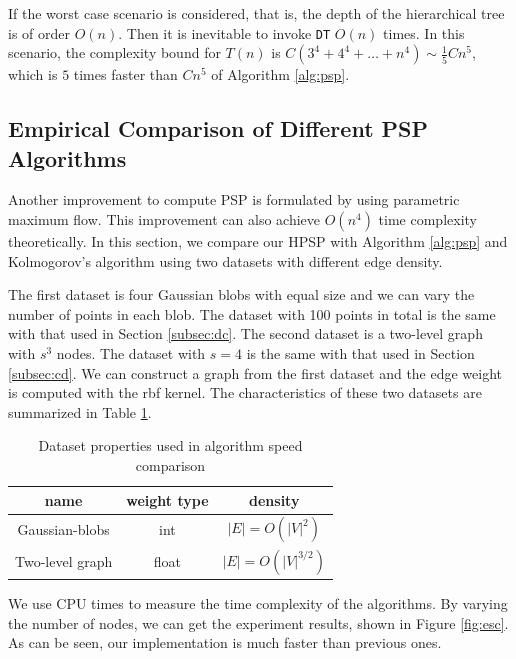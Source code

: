 If the worst case scenario is considered, that is, the depth of the hierarchical tree is of order $O(n)$. Then it is inevitable to invoke \texttt{DT} $O(n)$ times.
In this scenario, the complexity bound for $T(n)$ is $C(3^4+4^4 + \dots + n^4) \sim \frac{1}{5}Cn^5$, which is $5$ times faster than $Cn^5$ of Algorithm \ref{alg:psp}.

\subsection{Empirical Comparison of Different PSP Algorithms}
Another improvement to compute PSP is formulated by \cite{kolmogorov} using parametric maximum flow.
This improvement can also achieve $O(n^4)$ time complexity theoretically. 
In this section, we compare our HPSP with Algorithm \ref{alg:psp} and Kolmogorov's algorithm
using two datasets with different edge density.

The first dataset is four Gaussian blobs with equal size and we can vary the number of points in each blob. The dataset with 100 points in total is the same with that used in 
Section \ref{subsec:dc}. The second dataset is a two-level graph with $s^3$ nodes. The dataset with $s=4$ is the same with that used in Section \ref{subsec:cd}.
We can construct a graph from the first dataset and the edge weight is computed with the rbf kernel. The characteristics of these two datasets are summarized in
Table \ref{tab:alg_compare}.
\begin{table}[!ht]
\centering
\begin{tabular}{ccc}
\hline
name & weight type & density \\
\hline
Gaussian-blobs & int & $|E|=O(|V|^2)$\\
Two-level graph & float & $|E|=O(|V|^{3/2})$\\
\hline
\end{tabular}
\caption{Dataset properties used in algorithm speed comparison} \label{tab:alg_compare}
\end{table}
We use CPU times to measure the time complexity of the algorithms. By varying the number of nodes, we can get the experiment results, shown in Figure \ref{fig:esc}.
As can be seen, our implementation is much faster than previous ones.

